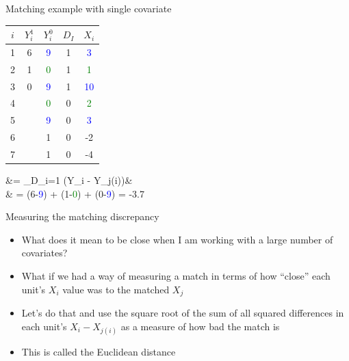 \documentclass{beamer}
\begin{document}
	
\begin{frame}{Matching example with single covariate}
	
	\begin{table}
	\begin{tabular}{c|c|c|c|c}
	\hline
	$i$ & $Y^1_i$ & $Y^0_i$ & $D_I$ & $X_i$ \\
	\hline
	1 & 6 &  \textcolor{blue}{9} & 1 & \textcolor{blue}{3} \\
	2 & 1 &  \textcolor{green}{0} & 1 & \textcolor{green}{1} \\
	3 & 0 &   \textcolor{blue}{9} & 1 & \textcolor{blue}{10} \\
	\hline
	4 &  & \textcolor{green}{0} & 0 & \textcolor{green}{2} \\
	5 &  & \textcolor{blue}{9} & 0 & \textcolor{blue}{3} \\
	6 &  & 1 & 0 & -2 \\
	7 &  & 1 & 0 & -4 \\
	\hline
	\end{tabular}
	\end{table}
	
	
	\begin{flalign*}
		&= \sum_{D_i=1} (Y_i - Y_{j(i)})& \\
		& =  \cdot (6-\textcolor{blue}{9}) +  \cdot (1-\textcolor{green}{0}) +  \cdot (0-\textcolor{blue}{9}) = -3.7
	\end{flalign*}

\end{frame}


%



\begin{frame}{Measuring the matching discrepancy}

\begin{itemize}
\item What does it mean to be close when I am working with a large number of covariates?
\item What if we had a way of measuring a match in terms of how ``close'' each unit's $X_i$ value was to the matched $X_j$
\item Let's do that and use the square root of the sum of all squared differences in each unit's $X_i - X_{j(i)}$ as a measure of how bad the match is
\item This is called the Euclidean distance
\end{itemize}


\end{frame}
\end{document}
